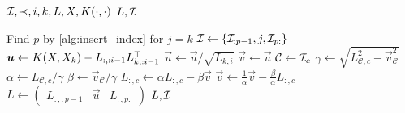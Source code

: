 \begin{algorithmic}[1]
  \REQUIRE \( \mathcal{I}, \prec, i, k, L, X, K(\cdot, \cdot) \)
  \ENSURE \( L, \mathcal{I} \)

  \STATE Find \( p \) by \cref{alg:insert_index} for \( j = k \)
  \STATE \( \mathcal{I} \gets \{ \mathcal{I}_{:p - 1}, j, \mathcal{I}_{p:} \} \)
  \STATE \( \bm{u} \gets K(X, X_k) - L_{:, :i - 1} L_{k, :i - 1}^{\top} \)
  \STATE \( \vec{u} \gets \vec{u}/\sqrt{L_{k, i}} \)
  \STATE \( \vec{v} \gets \vec{u} \)
    \STATE \( \mathcal{C} \gets \mathcal{I}_c \)
    \STATE \( \gamma \gets
      \sqrt{L_{\mathcal{C}, c}^2 - \vec{v}_{\mathcal{C}}^2}
    \)
    \STATE \( \alpha \gets  L_{\mathcal{C}, c}/\gamma \)
    \STATE \( \beta \gets \vec{v}_{\mathcal{C}}/\gamma \)
    \STATE \( L_{:, c} \gets \alpha L_{:, c} - \beta \vec{v} \)
    \STATE \( \vec{v} \gets
      \frac{1}{\alpha} \vec{v} - \frac{\beta}{\alpha} L_{:, c}
    \)
  \ENDFOR
  \STATE \( L \gets
    \begin{pmatrix}
      L_{:, :p - 1} & \vec{u} & L_{:, p:}
    \end{pmatrix}
  \)
  \RETURN \( L, \mathcal{I} \)
\end{algorithmic}
